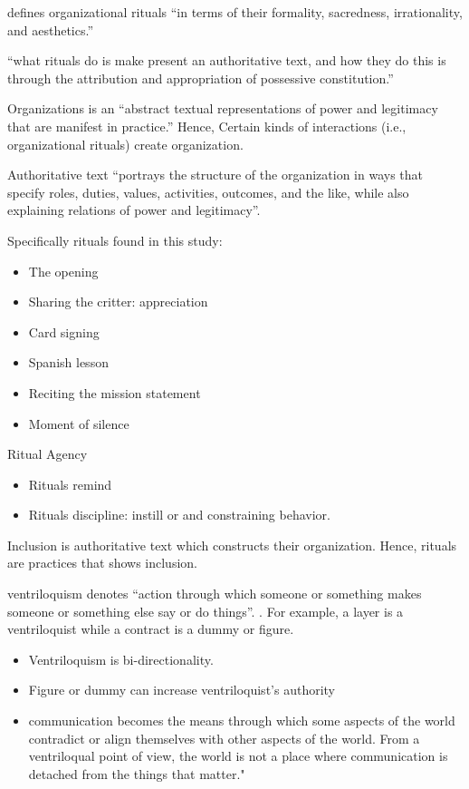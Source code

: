 \documentclass[
]{book}
\providecommand{\tightlist}{%
  \setlength{\itemsep}{0pt}\setlength{\parskip}{0pt}}
\begin{document}
\citep{Koschmann_2015}

\citep{Knuf_1993} defines organizational rituals ``in terms of their formality, sacredness, irrationality, and aesthetics.''

``what rituals do is make present an authoritative text, and how they do this is through the attribution and appropriation of possessive constitution.''

Organizations is an ``abstract textual representations of power and legitimacy that are manifest in practice.'' Hence, Certain kinds of interactions (i.e., organizational rituals) create organization.

Authoritative text ``portrays the structure of the organization in ways that specify roles, duties, values, activities, outcomes, and the like, while also explaining relations of power and legitimacy''.

Specifically rituals found in this study:

\begin{itemize}
\tightlist
\item
  The opening
\item
  Sharing the critter: appreciation
\item
  Card signing
\item
  Spanish lesson
\item
  Reciting the mission statement
\item
  Moment of silence
\end{itemize}

Ritual Agency

\begin{itemize}
\tightlist
\item
  Rituals remind
\item
  Rituals discipline: instill or and constraining behavior.
\end{itemize}

Inclusion is authoritative text which constructs their organization.
Hence, rituals are practices that shows inclusion.

\citep{Cooren_2015}

ventriloquism denotes ``action through which someone or something makes someone or something else say or do things''.
\citep{Cooren_2010}.
For example, a layer is a ventriloquist while a contract is a dummy or figure.

\begin{itemize}
\tightlist
\item
  Ventriloquism is bi-directionality.
\item
  Figure or dummy can increase ventriloquist's authority
\item
  communication becomes the means through which some aspects of the world contradict or align themselves with other aspects of the world. From a ventriloqual point of view, the world is not a place where communication is detached from the things that matter."
\end{itemize}
\end{document}
